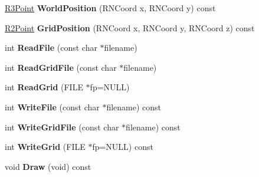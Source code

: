 \begin{DoxyCompactItemize}
\item 
\hyperlink{class_r3_point}{R3\+Point} {\bfseries World\+Position} (R\+N\+Coord x, R\+N\+Coord y) const \hypertarget{class_r3_planar_grid_ad8e7ce309286385844c7377f1e3d846e}{}\label{class_r3_planar_grid_ad8e7ce309286385844c7377f1e3d846e}

\item 
\hyperlink{class_r2_point}{R2\+Point} {\bfseries Grid\+Position} (R\+N\+Coord x, R\+N\+Coord y, R\+N\+Coord z) const \hypertarget{class_r3_planar_grid_aade57f1c3f249916e174fe00d6460790}{}\label{class_r3_planar_grid_aade57f1c3f249916e174fe00d6460790}

\item 
int {\bfseries Read\+File} (const char $\ast$filename)\hypertarget{class_r3_planar_grid_a6cdb68aaa509c36ad4782770d7e52664}{}\label{class_r3_planar_grid_a6cdb68aaa509c36ad4782770d7e52664}

\item 
int {\bfseries Read\+Grid\+File} (const char $\ast$filename)\hypertarget{class_r3_planar_grid_a27a1a0c5e6f818466c1d845c3236fe7f}{}\label{class_r3_planar_grid_a27a1a0c5e6f818466c1d845c3236fe7f}

\item 
int {\bfseries Read\+Grid} (F\+I\+LE $\ast$fp=N\+U\+LL)\hypertarget{class_r3_planar_grid_a509da3fc4b25a39a6cf2829c2c5824f9}{}\label{class_r3_planar_grid_a509da3fc4b25a39a6cf2829c2c5824f9}

\item 
int {\bfseries Write\+File} (const char $\ast$filename) const \hypertarget{class_r3_planar_grid_a2793986f2e65b7db56d8290fca68d182}{}\label{class_r3_planar_grid_a2793986f2e65b7db56d8290fca68d182}

\item 
int {\bfseries Write\+Grid\+File} (const char $\ast$filename) const \hypertarget{class_r3_planar_grid_aa69d065d267dcfc998e2d4cb3c39c29f}{}\label{class_r3_planar_grid_aa69d065d267dcfc998e2d4cb3c39c29f}

\item 
int {\bfseries Write\+Grid} (F\+I\+LE $\ast$fp=N\+U\+LL) const \hypertarget{class_r3_planar_grid_a2aaa69a168cf64a6139d72c03421f07f}{}\label{class_r3_planar_grid_a2aaa69a168cf64a6139d72c03421f07f}

\item 
void {\bfseries Draw} (void) const \hypertarget{class_r3_planar_grid_ab52a2db40620fef9903e5f0f89609a57}{}\label{class_r3_planar_grid_ab52a2db40620fef9903e5f0f89609a57}


\end{DoxyCompactItemize}
